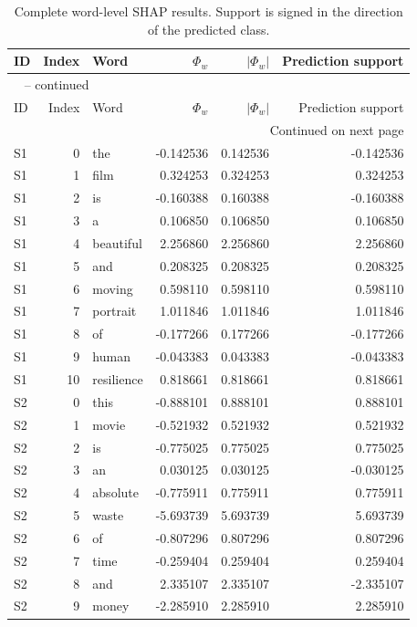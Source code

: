 \begin{longtable}{@{}lrlrrr@{}}
\caption{Complete word-level SHAP results. Support is signed in the direction of the predicted class.}\label{tab:word-values}\\
\toprule
ID & Index & Word & $\Phi_w$ & $|\Phi_w|$ & Prediction support \\
\midrule
\endfirsthead
\multicolumn{6}{l}{\tablename\ \thetable{} -- continued}\\
\toprule
ID & Index & Word & $\Phi_w$ & $|\Phi_w|$ & Prediction support \\
\midrule
\endhead
\midrule\multicolumn{6}{r}{Continued on next page}\\
\endfoot
\bottomrule
\endlastfoot
S1 & 0 & the & -0.142536 & 0.142536 & -0.142536 \\
S1 & 1 & film & 0.324253 & 0.324253 & 0.324253 \\
S1 & 2 & is & -0.160388 & 0.160388 & -0.160388 \\
S1 & 3 & a & 0.106850 & 0.106850 & 0.106850 \\
S1 & 4 & beautiful & 2.256860 & 2.256860 & 2.256860 \\
S1 & 5 & and & 0.208325 & 0.208325 & 0.208325 \\
S1 & 6 & moving & 0.598110 & 0.598110 & 0.598110 \\
S1 & 7 & portrait & 1.011846 & 1.011846 & 1.011846 \\
S1 & 8 & of & -0.177266 & 0.177266 & -0.177266 \\
S1 & 9 & human & -0.043383 & 0.043383 & -0.043383 \\
S1 & 10 & resilience & 0.818661 & 0.818661 & 0.818661 \\
S2 & 0 & this & -0.888101 & 0.888101 & 0.888101 \\
S2 & 1 & movie & -0.521932 & 0.521932 & 0.521932 \\
S2 & 2 & is & -0.775025 & 0.775025 & 0.775025 \\
S2 & 3 & an & 0.030125 & 0.030125 & -0.030125 \\
S2 & 4 & absolute & -0.775911 & 0.775911 & 0.775911 \\
S2 & 5 & waste & -5.693739 & 5.693739 & 5.693739 \\
S2 & 6 & of & -0.807296 & 0.807296 & 0.807296 \\
S2 & 7 & time & -0.259404 & 0.259404 & 0.259404 \\
S2 & 8 & and & 2.335107 & 2.335107 & -2.335107 \\
S2 & 9 & money & -2.285910 & 2.285910 & 2.285910 \\

\end{longtable}

